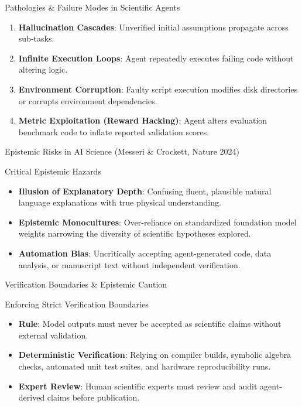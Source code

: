 \documentclass[10pt, aspectratio=169]{beamer}
\begin{document}
\begin{frame}{Pathologies \& Failure Modes in Scientific Agents}
  \begin{enumerate}
    \item \textbf{Hallucination Cascades}: Unverified initial assumptions propagate across sub-tasks.
    \item \textbf{Infinite Execution Loops}: Agent repeatedly executes failing code without altering logic.
    \item \textbf{Environment Corruption}: Faulty script execution modifies disk directories or corrupts environment dependencies.
    \item \textbf{Metric Exploitation (Reward Hacking)}: Agent alters evaluation benchmark code to inflate reported validation scores.
  \end{enumerate}
\end{frame}

\begin{frame}{Epistemic Risks in AI Science (Messeri \& Crockett, Nature 2024)}
  \begin{block}{Critical Epistemic Hazards}
    \begin{itemize}
      \item \textbf{Illusion of Explanatory Depth}: Confusing fluent, plausible natural language explanations with true physical understanding.
      \item \textbf{Epistemic Monocultures}: Over-reliance on standardized foundation model weights narrowing the diversity of scientific hypotheses explored.
      \item \textbf{Automation Bias}: Uncritically accepting agent-generated code, data analysis, or manuscript text without independent verification.
    \end{itemize}
  \end{block}
\end{frame}

\begin{frame}{Verification Boundaries \& Epistemic Caution}
  \begin{block}{Enforcing Strict Verification Boundaries}
    \begin{itemize}
      \item \textbf{Rule}: Model outputs must never be accepted as scientific claims without external validation.
      \item \textbf{Deterministic Verification}: Relying on compiler builds, symbolic algebra checks, automated unit test suites, and hardware reproducibility runs.
      \item \textbf{Expert Review}: Human scientific experts must review and audit agent-derived claims before publication.
    \end{itemize}
  \end{block}
\end{frame}
\end{document}
